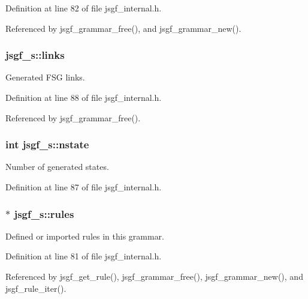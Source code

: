 Definition at line 82 of file jsgf\-\_\-internal.\-h.



Referenced by jsgf\-\_\-grammar\-\_\-free(), and jsgf\-\_\-grammar\-\_\-new().

\subsubsection[{links}]{ jsgf\-\_\-s\-::links}\label{structjsgf__s_a6ee31bac19680f01c413969a75ad838a}


Generated F\-S\-G links. 



Definition at line 88 of file jsgf\-\_\-internal.\-h.



Referenced by jsgf\-\_\-grammar\-\_\-free().

\subsubsection[{nstate}]{\setlength{\rightskip}{0pt plus 5cm}int jsgf\-\_\-s\-::nstate}\label{structjsgf__s_a380c1b82e1bd776438303159e5129773}


Number of generated states. 



Definition at line 87 of file jsgf\-\_\-internal.\-h.

\subsubsection[{rules}]{$\ast$ jsgf\-\_\-s\-::rules}\label{structjsgf__s_af257160279ab56ffca65966aeac18ef9}


Defined or imported rules in this grammar. 



Definition at line 81 of file jsgf\-\_\-internal.\-h.



Referenced by jsgf\-\_\-get\-\_\-rule(), jsgf\-\_\-grammar\-\_\-free(), jsgf\-\_\-grammar\-\_\-new(), and jsgf\-\_\-rule\-\_\-iter().

